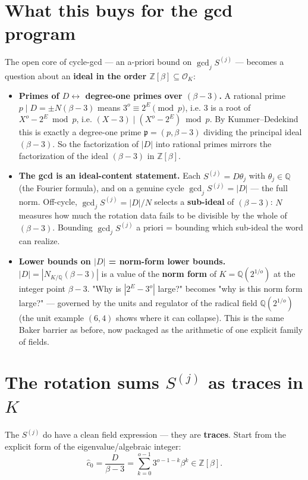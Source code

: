\documentclass[11pt]{article}
\begin{document}
\section{What this buys for the gcd program}

The open core of cycle-gcd --- an a-priori bound on $\gcd_j S^{(j)}$ --- becomes a question about an \textbf{ideal in the order $\mathbb Z[\beta]\subseteq\mathcal O_K$}:

\begin{itemize}
    \item \textbf{Primes of $D \leftrightarrow$ degree-one primes over $(\beta-3)$.} A rational prime $p \mid D = \pm N(\beta-3)$ means $3^o \equiv 2^E \pmod p$, i.e. $3$ is a root of $X^o-2^E \bmod p$, i.e. $(X-3) \mid (X^o-2^E) \bmod p$. By Kummer--Dedekind this is exactly a degree-one prime $\mathfrak p = (p, \beta-3)$ dividing the principal ideal $(\beta-3)$. So the factorization of $|D|$ into rational primes mirrors the factorization of the ideal $(\beta-3)$ in $\mathbb Z[\beta]$.
    \item \textbf{The gcd is an ideal-content statement.} Each $S^{(j)}=D\theta_j$ with $\theta_j\in\mathbb Q$ (the Fourier formula), and on a genuine cycle $\gcd_j S^{(j)}=|D|$ --- the full norm. Off-cycle, $\gcd_j S^{(j)}=|D|/N$ selects a \textbf{sub-ideal} of $(\beta-3)$: $N$ measures how much the rotation data fails to be divisible by the whole of $(\beta-3)$. Bounding $\gcd_j S^{(j)}$ a priori = bounding which sub-ideal the word can realize.
    \item \textbf{Lower bounds on $|D|$ = norm-form lower bounds.} $|D|=|N_{K/\mathbb Q}(\beta-3)|$ is a value of the \textbf{norm form} of $K=\mathbb Q(2^{1/o})$ at the integer point $\beta-3$. "Why is $|2^E-3^o|$ large?" becomes "why is this norm form large?" --- governed by the units and regulator of the radical field $\mathbb Q(2^{1/o})$ (the unit example $(6,4)$ shows where it can collapse). This is the same Baker barrier as before, now packaged as the arithmetic of one explicit family of fields.
\end{itemize}

\section{The rotation sums $S^{(j)}$ as traces in $K$}

The $S^{(j)}$ do have a clean field expression --- they are \textbf{traces}. Start from the explicit form of the eigenvalue/algebraic integer:
\[
\hat c_0 = \frac{D}{\beta-3} = \sum_{k=0}^{o-1} 3^{o-1-k} \beta^{k} \in \mathbb Z[\beta].
\]
\end{document}
